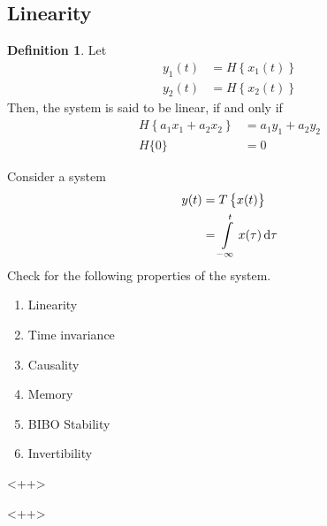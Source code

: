 \documentclass[titlepage, fleqn, a4paper, 12pt, twoside]{article}
\theoremstyle{definition}
\newtheorem{definition}{Definition}
\theoremstyle{theorem}
\begin{document}
\subsection{Linearity}

\begin{definition}
	Let
	\begin{align*}
		y_1(t) & = H\left\{ x_1(t) \right\} \\
		y_2(t) & = H\left\{ x_2(t) \right\}
	\end{align*}
	Then, the system is said to be linear, if and only if
	\begin{align*}
		H\left\{ a_1 x_1 + a_2 x_2 \right\} & = a_1 y_1 + a_2 y_2 \\
		H\{0\}                              & = 0
	\end{align*}
\end{definition}

\begin{question}
	Consider a system
	\begin{align*}
		y(t) &= T\left\{ x(t) \right\}\\
		&= \int\limits_{-\infty}^{t} x(\tau) \dif \tau
	\end{align*}
	Check for the following properties of the system.
	\begin{enumerate}
		\item Linearity
		\item Time invariance
		\item Causality
		\item Memory
		\item BIBO Stability
		\item Invertibility
	\end{enumerate}<++>
\end{question}<++>
\end{document}
